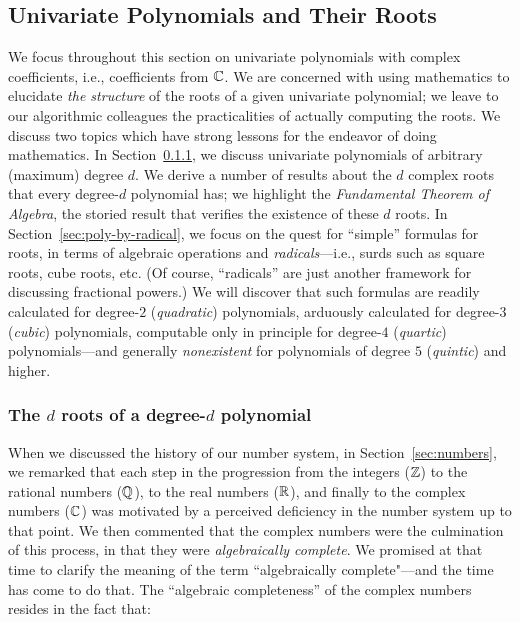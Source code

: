 \subsection{Univariate Polynomials and Their Roots}
\label{sec:univariate-polynomials}

  
 
 

We focus throughout this section on univariate polynomials with complex coefficients, i.e., coefficients from $\mathbb{C}$.  We are concerned with using mathematics to elucidate {\em the structure} of the roots of a given univariate polynomial; we leave to our algorithmic colleagues the practicalities of actually computing the roots.  We discuss two topics which have strong lessons for the endeavor of doing mathematics.  In Section~\ref{sec:fund-thm-algebra}, we discuss univariate polynomials of arbitrary (maximum) degree $d$.  We derive a number of results about the $d$ complex roots that every degree-$d$ polynomial has; we highlight the {\it Fundamental Theorem of Algebra}, the storied result that verifies the existence of these $d$ roots.  In Section~\ref{sec:poly-by-radical}, we focus on the quest for ``simple'' formulas for roots, in terms of algebraic operations and {\it radicals}---i.e., surds such as square roots, cube roots, etc.  (Of course, ``radicals'' are just another framework for discussing fractional powers.)  We will discover that such formulas are readily calculated for degree-$2$ ({\it quadratic}) polynomials, arduously calculated for degree-$3$ ({\it cubic}) polynomials, computable only in principle for degree-$4$ ({\it quartic}) polynomials---and generally {\em nonexistent} for polynomials of degree $5$ ({\it quintic}) and higher.

\subsubsection{The $d$ roots of a degree-$d$ polynomial}
\label{sec:fund-thm-algebra}


When we discussed the history of our number system, in Section~\ref{sec:numbers}, we remarked that each step in the progression from the integers ($\mathbb{Z}$) to the rational numbers ($\mathbb{Q}$), to the real numbers ($\mathbb{R}$), and finally to the complex numbers ($\mathbb{C}$) was motivated by a perceived deficiency in the number system up to that point.  We then commented that the complex numbers were the culmination of this process, in that they were {\it algebraically complete}.  We promised at that time to clarify the meaning of the term ``algebraically complete"---and the time has come to do that.  The ``algebraic completeness'' of the complex numbers resides in the fact that:

